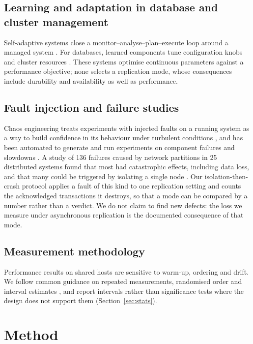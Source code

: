 \documentclass[preprint,12pt]{elsarticle}
\begin{document}
\subsection{Learning and adaptation in database and cluster management}
Self-adaptive systems close a monitor--analyse--plan--execute loop around a managed system \cite{kephart2003}. For databases, learned components tune configuration knobs \cite{vanaken2017,zhang2019,kanellis2022,lao2024,wang2021} and cluster resources \cite{rzadca2020,qiu2020}. These systems optimise continuous parameters against a performance objective; none selects a replication mode, whose consequences include durability and availability as well as performance.

\subsection{Fault injection and failure studies}
Chaos engineering treats experiments with injected faults on a running system as a way to build confidence in its behaviour under turbulent conditions \cite{basiri2016}, and has been automated to generate and run experiments on component failures and slowdowns \cite{basiri2019}. A study of 136 failures caused by network partitions in 25 distributed systems found that most had catastrophic effects, including data loss, and that many could be triggered by isolating a single node \cite{alquraan2018}. Our isolation-then-crash protocol applies a fault of this kind to one replication setting and counts the acknowledged transactions it destroys, so that a mode can be compared by a number rather than a verdict. We do not claim to find new defects: the loss we measure under asynchronous replication is the documented consequence of that mode.

\subsection{Measurement methodology}
Performance results on shared hosts are sensitive to warm-up, ordering and drift. We follow common guidance on repeated measurements, randomised order and interval estimates \cite{georges2007,kalibera2013}, and report intervals rather than significance tests where the design does not support them (Section~\ref{sec:stats}).

\section{Method}\label{sec:method}
\end{document}
